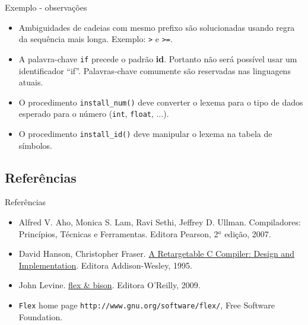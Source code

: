 \begin{frame}{Exemplo - observações}
  \begin{itemize}
  \item Ambiguidades de cadeias com mesmo prefixo são solucionadas
    usando \alert{regra da sequência mais longa}. Exemplo: {\tt >} e
    {\tt >=}.  \pause
  \item A palavra-chave {\tt if} \alert{precede} o padrão {\bf id}.
    Portanto não será possível usar um identificador ``if''.
    Palavras-chave comumente são reservadas nas linguagens atuais.
    \pause
  \item O procedimento {\tt install\_num()} deve \alert{converter} o
    lexema para o tipo de dados esperado para o número ({\tt int},
    {\tt float}, $\ldots$).  \pause
  \item O procedimento {\tt install\_id()} deve manipular o lexema
    na \alert{tabela de símbolos}.
  \end{itemize}
\end{frame}

\subsection*{Referências}

\begin{frame}{Referências}

  \begin{itemize}
  \item Alfred V. Aho, Monica S. Lam, Ravi Sethi, Jeffrey D. Ullman.
    Compiladores: Princípios, Técnicas e Ferramentas. Editora
    Pearson, 2$^a$ edição, 2007.
  \item David Hanson, Christopher
    Fraser. \href{https://www.amazon.com.br/Retargetable-Compiler-Design-Implementation/dp/0805316701}{A
      Retargetable C Compiler: Design and Implementation}. Editora
    Addison-Wesley, 1995.

  \item John
   Levine. \href{https://www.oreilly.com/library/view/flex-bison/9780596805418/}{flex \& bison}. Editora O'Reilly, 2009.

  \item {\tt Flex} home page {\tt http://www.gnu.org/software/flex/}, Free
    Software Foundation.
  \end{itemize}
 \end{frame}
